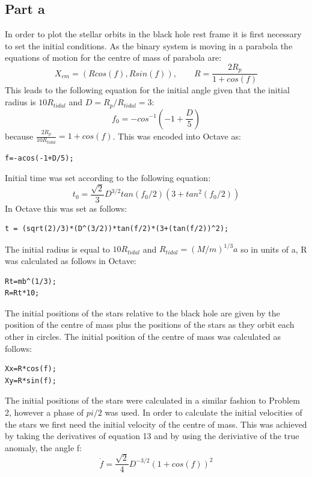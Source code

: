 \documentclass[a4paper,12pt]{article}
\begin{document}
\subsection{Part a}
In order to plot the stellar orbits in the black hole rest frame it is first necessary to set the initial conditions. As the binary system is moving in a parabola the equations of motion for the centre of mass of parabola are:
\begin{equation}
X_{cm}=(Rcos(f),Rsin(f)),  \qquad  R=\frac{2R_p}{1+cos(f)}     
\end{equation}
This leads to the following equation for the initial angle given that the initial radius is $10R_{tidal}$ and $D=R_p/R_{tidal}=3$:
\begin{equation}
f_0=-cos^{-1}\left(-1+\frac{D}{5}\right)
\end{equation}
because $\frac{2R_p}{10R_{tidal}}=1+cos(f)$.
This was encoded into Octave as:
\begin{lstlisting}
f=-acos(-1+D/5);
\end{lstlisting}
Initial time was set according to the following equation:
\begin{equation}
t_0=\frac{\sqrt{2}}{3}D^{3/2}tan(f_0/2)(3+tan^2(f_0/2))
\end{equation}
In Octave this was set as follows:
\begin{lstlisting}
t = (sqrt(2)/3)*(D^(3/2))*tan(f/2)*(3+(tan(f/2))^2);
\end{lstlisting}
The initial radius is equal to $10R_{tidal}$ and $R_{tidal}=(M/m)^{1/3}a$ so in units of a, R was calculated as follows in Octave:
\begin{lstlisting}
Rt=mb^(1/3);
R=Rt*10;
\end{lstlisting}
The initial positions of the stars relative to the black hole are given by the position of the centre of mass plus the positions of the stars as they orbit each other in circles. The initial position of the centre of mass was calculated as follows:
\begin{lstlisting}
Xx=R*cos(f);
Xy=R*sin(f);
\end{lstlisting}
The initial positions of the stars were calculated in a similar fashion to Problem 2, however a phase of $pi/2$ was used.
In order to calculate the initial velocities of the stars we first need the initial velocity of the centre of mass. This was achieved by taking the derivatives of equation 13 and by using the deriviative of the true anomaly, the angle f:
\begin{equation}
\dot{f}=\frac{\sqrt{2}}{4}D^{-3/2}(1+cos(f))^2
\end{equation}
\end{document}
